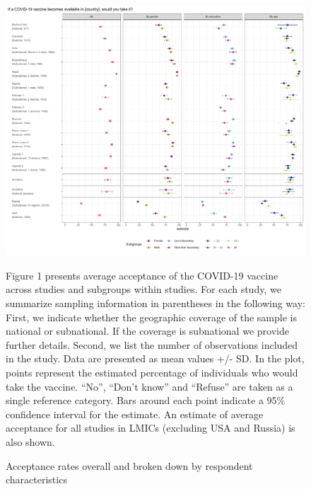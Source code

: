 \documentclass[
  12pt,
]{article}
\begin{document}
\begin{landscape}
\begin{table}[!h]
{\begin{threeparttable}
\begin{tablenotes}
\end{tablenotes}
\end{threeparttable}}
\end{table}
\end{landscape}
\newpage

\begin{figure}[!ht]
\caption{Acceptance rates overall and broken down by respondent characteristics \label{fig:mainfigure1}}

\includegraphics{paper_files/figure-latex/mainfigure1-1.pdf}

\scriptsize{Figure 1 presents average acceptance of the COVID-19 vaccine across studies and subgroups within studies. For each study, we summarize sampling information in parentheses in the following way: First, we indicate whether the geographic coverage of the sample is national or subnational. If the coverage is subnational we provide further details. Second, we list the number of observations included in the study. Data are presented as mean values +/- SD. In the plot, points represent the estimated percentage of individuals who would take the vaccine. ``No'', ``Don't know'' and ``Refuse'' are taken as a single reference category. Bars around each point indicate a 95\% confidence interval for the estimate. An estimate of average acceptance for all studies in LMICs (excluding USA and Russia) is also shown.}
\end{figure}
\end{document}
